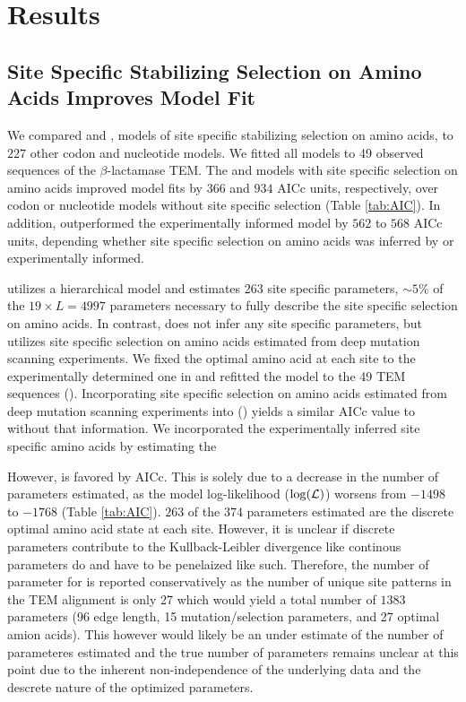 \documentclass[12pt]{article}
\begin{document}
\section*{Results}

\subsection*{Site Specific Stabilizing Selection on Amino Acids Improves Model Fit}
We compared \phydms \citep{hilton2017} and \selac \citep{beaulieu2018}, models of site specific stabilizing selection on amino acids, to $227$ other codon and nucleotide models.
We fitted all models to 49 observed sequences of the $\beta$-lactamase TEM.
The \phydms and \selac models with site specific selection on amino acids improved model fits by $366$ and $934$ AICc units, respectively, over codon or nucleotide models without site specific selection (Table \ref{tab:AIC}).
In addition, \selac outperformed the experimentally informed model \phydms by $562$ to $568$ AICc units, depending whether site specific selection on amino acids was inferred by \selac or experimentally informed.

\selac utilizes a hierarchical model and estimates 263 site specific parameters, $\sim5\%$ of the $19\times L = 4997$ parameters necessary to fully describe the site specific selection on amino acids.
In contrast, \phydms does not infer any site specific parameters, but utilizes site specific selection on amino acids estimated from deep mutation scanning experiments.
We fixed the optimal amino acid at each site to the experimentally determined one in \selac and refitted the model to the 49 TEM sequences (\selacDMS).
Incorporating site specific selection on amino acids estimated from deep mutation scanning experiments into \selac (\selacDMS) yields a similar AICc value to \selac without that information.
We incorporated the experimentally inferred site specific amino acids by estimating the 

However, \selacDMS is favored by AICc.
This is solely due to a decrease in the number of parameters estimated, as the model log-likelihood ($\log(\mathcal{L})$) worsens from $-1498$ to $-1768$ (Table \ref{tab:AIC}).
$263$ of the $374$ parameters estimated are the discrete optimal amino acid state at each site. 
However, it is unclear if discrete parameters contribute to the Kullback-Leibler divergence like continous parameters do and have to be penelaized like such.
Therefore, the number of parameter for \selac is reported conservatively as the number of unique site patterns in the TEM alignment is only 27 which would yield a total number of $1383$ parameters (96 edge length, 15 mutation/selection parameters, and 27 optimal amion acids).
This however would likely be an under estimate of the number of parameteres estimated and the true number of parameters remains unclear at this point due to the inherent non-independence of the underlying data and the descrete nature of the optimized parameters.
\end{document}

